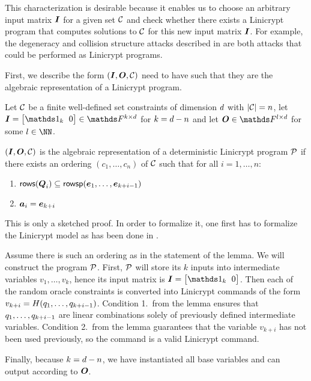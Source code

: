 This characterization is desirable because it enables us to choose an arbitrary input matrix $\I$ for a given set $\C$ and check whether there exists a Linicrypt program that computes solutions to $\C$ for this new input matrix $\I$.
For example, the degeneracy and collision structure attacks described in \cite{TCC:McQSwoRos19} are both attacks that could be performed as Linicrypt programs.

First, we describe the form $(\I, \O, \C)$ need to have such that they are the algebraic representation of a Linicrypt program.
\begin{lemma}
\label{is_algebraic_repr}
    Let $\C$ be a finite well-defined set constraints of dimension $\base$ with $|\C| = n$,
    let $\I = \m{\Id_k & 0} \in \F^{k\times\base}$ for $k = \base - n$
    and let $\O \in \F^{l \times \base}$ for some $l \in \NN$.
       
    $(\I, \O, \C)$ is the algebraic representation of a deterministic Linicrypt program $\P$
    if there exists an ordering $(c_1, \dots, c_n)$ of $\C$
    such that for all $i=1, \dots, n$:
    \begin{enumerate}
    \item
    $\rows(\Q_i) \subseteq \rowsp(\dts \ve {k+i-1})$
    \item
    $\va_i = \ve_{k+i}$
    \end{enumerate}
\end{lemma}

\begin{sketch}
    This is only a sketched proof.
    In order to formalize it, one first has to formalize the Linicrypt model as has been done in \cite{C:CarRos16}.

    Assume there is such an ordering as in the statement of the lemma.
    We will construct the program $\P$.
    First, $\P$ will store its $k$ inputs into intermediate variables $v_1, \dots, v_k$,
    hence its input matrix is $\I = \m{\Id_k & 0}$.
    Then each of the random oracle constraints is converted into Linicrypt commands of the form
    $v_{k+i} = H(\dts q {k+i-1})$.
    Condition 1.~from the lemma ensures that $\dts q {k+i-1}$ are linear combinations solely of previously defined intermediate variables.  
    Condition 2.~from the lemma guarantees that the variable $v_{k+i}$ has not been used previously,
    so the command is a valid Linicrypt command.
    
    Finally, because $k=\base - n$, we have instantiated all base variables
    and can output according to $\O$.
\end{sketch}

